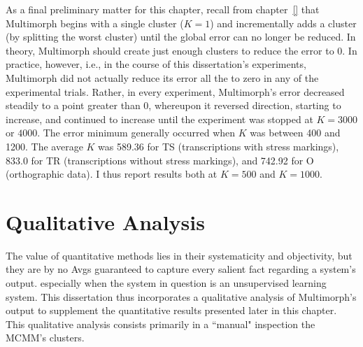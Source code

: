 As a final preliminary matter for this chapter, recall from chapter~\ref{}  that Multimorph begins with a single cluster ($K = 1$) 
and incrementally adds a cluster (by splitting the worst cluster) until the global error can no longer be reduced. 
In theory, Multimorph should create just enough clusters to reduce the error
to 0. In practice, however, i.e., in the course of this dissertation's experiments,
 Multimorph did not actually reduce its error all the to zero in any of the experimental trials. 
 Rather, in every experiment, Multimorph's error decreased steadily to a point greater than 0, 
 whereupon it reversed direction, starting to 
increase, and continued to increase until the experiment was stopped at $K = 3000$ or $4000$.  
The error minimum generally occurred when $K$ was between 400 and 1200. 
The average $K$ was 589.36 for TS (transcriptions with stress markings), 833.0 for 
TR (transcriptions without stress markings), and 742.92 for O (orthographic data). I thus 
report results both at $K = 500$ and $K = 1000$.

\section{Qualitative Analysis}
\label{sec:qual}
The value of quantitative methods lies in their systematicity and objectivity, but
	they are by no Avgs guaranteed to capture every salient fact regarding a system's output. 
	especially when the system in question is an unsupervised learning system. 
	 This dissertation thus incorporates a qualitative analysis of Multimorph's output to supplement the  
	 quantitative results presented later in this chapter.
	This qualitative analysis consists primarily in a ``manual" inspection the MCMM's clusters.
	
